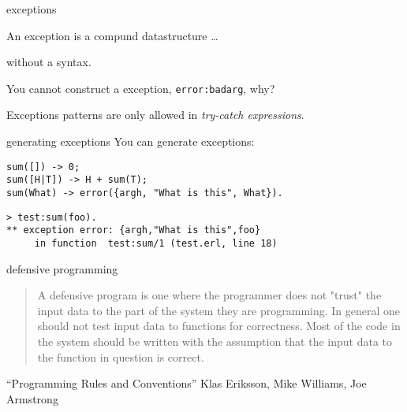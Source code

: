 \begin{frame}{exceptions}

An exception is a compund datastructure  \ldots

\pause\vspace{20pt}\hspace{40pt} without a syntax.

\pause\vspace{20pt} You cannot construct a exception, {\tt error:badarg}, why?

\pause\vspace{20pt} Exceptions patterns are only allowed in {\em try-catch expressions}.


\end{frame}

\begin{frame}[fragile]{generating exceptions}
You can generate exceptions:

\pause\vspace{20pt}
\begin{verbatim}
sum([]) -> 0;
sum([H|T]) -> H + sum(T);
sum(What) -> error({argh, "What is this", What}).
\end{verbatim}

\pause\vspace{20pt}
\begin{verbatim}
> test:sum(foo).
** exception error: {argh,"What is this",foo}
     in function  test:sum/1 (test.erl, line 18)
\end{verbatim}
\end{frame}

\begin{frame}{defensive programming}

\begin{quote}
A defensive program is one where the programmer does not "trust" the input data to the part of the system they are programming. In general one should not test input data to functions for correctness. Most of the code in the system should be written with the assumption that the input data to the function in question is correct.
\end{quote}
 ``Programming Rules and Conventions'' Klas Eriksson, Mike Williams, Joe Armstrong 



\end{frame}






